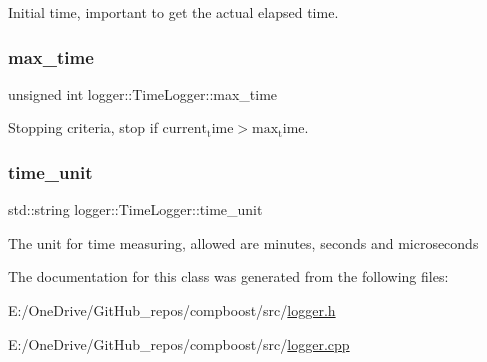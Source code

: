 Initial time, important to get the actual elapsed time. 

\mbox{\label{classlogger_1_1_time_logger_a48ea18ddd1f44f11ad52448cfde37e63}} 
\subsubsection{\texorpdfstring{max\+\_\+time}{max\_time}}
{\footnotesize\ttfamily unsigned int logger\+::\+Time\+Logger\+::max\+\_\+time\hspace{0.3cm}{\ttfamily [private]}}



Stopping criteria, stop if $\mathrm{current_time} > \mathrm{max_time}$. 

\mbox{\label{classlogger_1_1_time_logger_ab5a6998dea294708d1d393b2b2f240bb}} 
\subsubsection{\texorpdfstring{time\+\_\+unit}{time\_unit}}
{\footnotesize\ttfamily std\+::string logger\+::\+Time\+Logger\+::time\+\_\+unit\hspace{0.3cm}{\ttfamily [private]}}



The unit for time measuring, allowed are {\ttfamily minutes}, {\ttfamily seconds} and {\ttfamily microseconds} 



The documentation for this class was generated from the following files\+:\begin{DoxyCompactItemize}
\item 
E\+:/\+One\+Drive/\+Git\+Hub\+\_\+repos/compboost/src/\mbox{\hyperlink{logger_8h}{logger.\+h}}\item 
E\+:/\+One\+Drive/\+Git\+Hub\+\_\+repos/compboost/src/\mbox{\hyperlink{logger_8cpp}{logger.\+cpp}}\end{DoxyCompactItemize}
